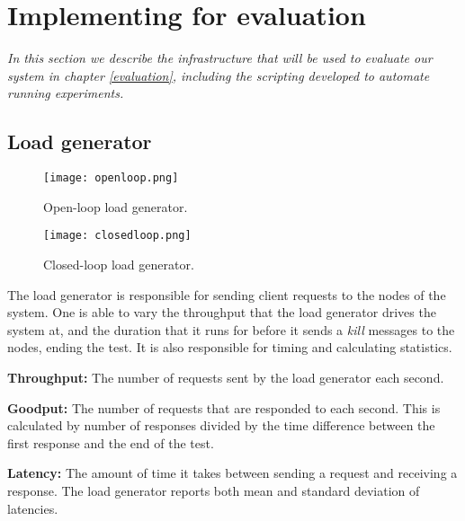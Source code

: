 
\section{Implementing for evaluation} \label{benchcode}

\textit{In this section we describe the infrastructure that will be used to evaluate our system in chapter \ref{evaluation}, including the scripting developed to automate running experiments.}

\subsection{Load generator} \label{loadgenerator}

\begin{figure}[h]
\centering
\texttt{[image: openloop.png]}
\caption{Open-loop load generator.}
\label{openloop}
\end{figure}

\begin{figure}[h]
\centering
\texttt{[image: closedloop.png]}
\caption{Closed-loop load generator.}
\label{closedloop}
\end{figure}

The load generator is responsible for sending client requests to the nodes of the system. One is able to vary the throughput that the load generator drives the system at, and the duration that it runs for before it sends a \textit{kill} messages to the nodes, ending the test. It is also responsible for timing and calculating statistics.

\textbf{Throughput: } The number of requests sent by the load generator each second.

\textbf{Goodput: } The number of requests that are responded to each second. This is calculated by number of responses divided by the time difference between the first response and the end of the test.

\textbf{Latency: } The amount of time it takes between sending a request and receiving a response. The load generator reports both mean and standard deviation of latencies.

